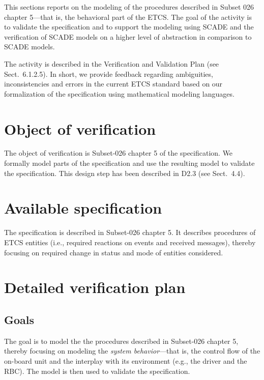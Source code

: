 \label{sec:twt}
This sections reports on the modeling of the procedures described in Subset 026 chapter 5---that is, the behavioral part of the ETCS. The goal of the activity is to validate the specification and to support the modeling using SCADE and the verification of SCADE models on a higher level of abstraction in comparison to SCADE models.

The activity is described in the Verification and Validation Plan (see Sect.~6.1.2.5). In short, we provide feedback regarding ambiguities, inconsistencies and errors in the current ETCS standard based on our formalization of the specification using mathematical modeling languages.

\section{Object of verification}

The object of verification is Subset-026 chapter 5 of the specification. We formally model parts of the specification and use the resulting model to validate the specification. This design step has been described in D2.3 (see Sect.~4.4).

\section{Available specification}

The specification is described in Subset-026 chapter 5. It describes procedures of ETCS entities (i.e., required reactions on events and received messages), thereby focusing on required change in status and mode of entities considered.


\section{Detailed verification plan}

\subsection{Goals} 

The goal is to model the the procedures described in Subset-026 chapter 5, thereby focusing on modeling the \textit{system behavior}---that is, the control flow of the on-board unit and the interplay with its environment (e.g., the driver and the RBC). The model is then used to validate the specification.

